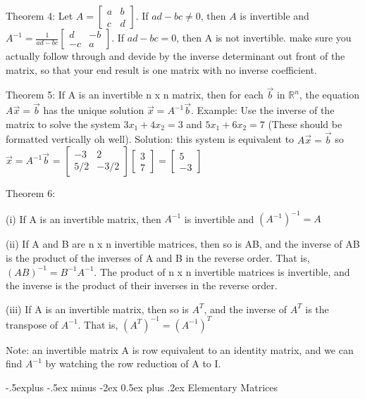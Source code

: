 \documentclass[10pt,landscape]{article}
\makeatletter
\renewcommand{\subsection}{\@startsection{subsection}{2}{0mm}%
                                {-.5explus -.5ex minus -2ex}%
                                {0.5ex plus .2ex}%
                                {\normalfont\footnotesize\bfseries}}
\makeatother
\begin{document}
\begin{multicols}{4}
{{Theorem 4: Let $A = \left[\begin{array}{rr}a & b\\c & d \end{array}\right]$. If $ad-bc \ne 0$, then $A$ is invertible and $A^{-1}= \frac{1}{ad-bc}\left[\begin{array}{rr}d & -b\\-c & a \end{array}\right]$. If $ad-bc=0$, then A is not invertible. make sure you actually follow through and devide by the inverse determinant out front of the matrix, so that your end result is one matrix with no inverse coefficient.

Theorem 5: If A is an invertible n x n matrix, then for each $\vec{b}$ in $\mathbb{R}^n$, the equation $A\vec{x}=\vec{b}$ has the unique solution $\vec{x}=A^{-1}\vec{b}$. Example: Use the inverse of the matrix to solve the system $3x_1 + 4x_2 = 3$ and $5x_1 + 6x_2 = 7$ (These should be formatted vertically oh well). Solution: this system is equivalent to $A\vec{x}=\vec{b}$ so $\vec{x}=A^{-1}\vec{b}$ = $\left[\begin{array}{rr}-3 & 2\\5/2 & -3/2 \end{array}\right] \left[\begin{array}{rr}3\\7\end{array}\right]=\left[\begin{array}{rr}5\\-3\end{array}\right]$

Theorem 6: 

(i) If A is an invertible matrix, then $A^{-1}$ is invertible and $(A^{-1})^{-1} = A$

(ii) If A and B are n x n invertible matrices, then so is AB, and the inverse of AB is the product of the inverses of A and B in the reverse order. That is, $(AB)^{-1} = B^{-1}A^{-1}$. The product of n x n invertible matrices is invertible, and the inverse is the product of their inverses in the reverse order.

(iii) If A is an invertible matrix, then so is $A^T$, and the inverse of $A^T$ is the transpose of $A^{-1}$. That is, $(A^T)^{-1}=(A^{-1})^{T}$

Note: an invertible matrix A is row equivalent to an identity matrix, and we can find $A^{-1}$ by watching the row reduction of A to I.

\subsection{Elementary Matrices}

}}
\end{multicols}
\end{document}
